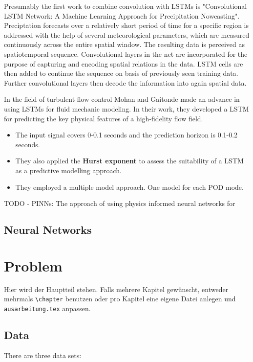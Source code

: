 \documentclass[
  a4paper,  %
  twoside,  %
  bibliography=totoc,
  headsepline,
  cleardoublepage=empty,
  parskip=half,
  draft=false
]{scrbook}
\begin{document}
Presumably the first work to combine convolution with LSTMs is "Convolutional LSTM Network: A Machine Learning Approach for Precipitation Nowcasting". \cite{ShiConvLSTMPrecipitation} Preciptation forecasts over a relatively short period of time for a specific region is addressed with the help of several meteorological parameters, which are measured continuously across the entire spatial window. The resulting data is perceived as spatiotemporal sequence. Convolutional layers in the net are incorporated for the purpose of capturing and encoding spatial relations in the data. LSTM cells are then added to continue the sequence on basis of previously seen training data. Further convolutional layers then decode the information into again spatial data.

In the field of turbulent flow control Mohan and Gaitonde \cite{mohan2018deep} made an advance in using LSTMs for fluid mechanic modeling. In their work, they developed a LSTM for predicting the key physical features of a high-fidelity flow field. 

\begin{itemize}
    \item The input signal covers 0-0.1 seconds and the prediction horizon is 0.1-0.2 seconds. 
    \item They also applied the \textbf{Hurst exponent} to assess the suitability of a LSTM as a predictive modelling approach.
    \item They employed a multiple model approach. One model for each POD mode.
\end{itemize}

TODO - PINNs: The approach of using physics informed neural networks for 

\section{Neural Networks}
\chapter{Problem}
\label{chap:k2}

Hier wird der Hauptteil stehen. Falls mehrere Kapitel gewünscht, entweder mehrmals \texttt{\textbackslash{}chapter} benutzen oder pro Kapitel eine eigene Datei anlegen und \texttt{ausarbeitung.tex} anpassen.


\section{Data}
There are three data sets:
\end{document}

